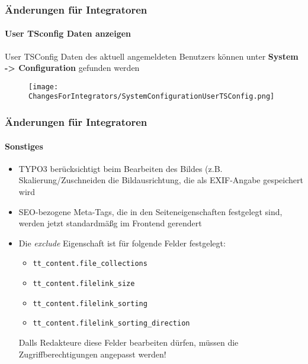 
\begin{frame}[fragile]
	\frametitle{Änderungen für Integratoren}
	\framesubtitle{User TSconfig Daten anzeigen}

	User TSConfig Daten des aktuell angemeldeten Benutzers können unter  
	\textbf{System -> Configuration} gefunden werden

	\begin{figure}
		\texttt{[image: ChangesForIntegrators/SystemConfigurationUserTSConfig.png]}
	\end{figure}

\end{frame}


\begin{frame}[fragile]
	\frametitle{Änderungen für Integratoren}
	\framesubtitle{Sonstiges}

	\begin{itemize}
		\item TYPO3 berücksichtigt beim Bearbeiten des Bildes (z.B. Skalierung/Zuschneiden
			die Bildausrichtung, die als EXIF-Angabe gespeichert wird
		\item SEO-bezogene Meta-Tags, die in den Seiteneigenschaften festgelegt sind,
			werden jetzt standardmäßg im Frontend gerendert
		\item Die \textit{exclude} Eigenschaft ist für folgende Felder festgelegt:

			\begin{itemize}
				\smaller
				\item \texttt{tt\_content.file\_collections}
				\item \texttt{tt\_content.filelink\_size}
				\item \texttt{tt\_content.filelink\_sorting}
				\item \texttt{tt\_content.filelink\_sorting\_direction}
			\end{itemize}

			\small
				Dalls Redakteure diese Felder bearbeiten dürfen, müssen die Zugriffberechtigungen 
				angepasst werden!
			\normalsize

	\end{itemize}

\end{frame}

